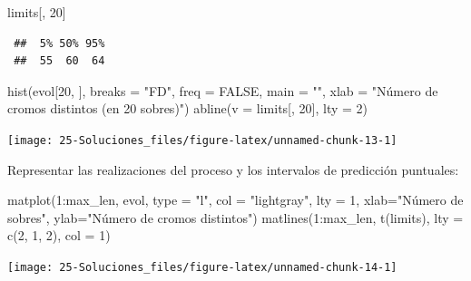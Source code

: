 \documentclass[
]{book}
\newenvironment{Shaded}{\begin{snugshade}}{\end{snugshade}}
\newcommand{\AttributeTok}[1]{\textcolor[rgb]{0.77,0.63,0.00}{#1}}
\newcommand{\ConstantTok}[1]{\textcolor[rgb]{0.00,0.00,0.00}{#1}}
\newcommand{\DecValTok}[1]{\textcolor[rgb]{0.00,0.00,0.81}{#1}}
\newcommand{\FunctionTok}[1]{\textcolor[rgb]{0.00,0.00,0.00}{#1}}
\newcommand{\NormalTok}[1]{#1}
\newcommand{\SpecialCharTok}[1]{\textcolor[rgb]{0.00,0.00,0.00}{#1}}
\newcommand{\StringTok}[1]{\textcolor[rgb]{0.31,0.60,0.02}{#1}}
\theoremstyle{break}
\theoremstyle{nonumberplain}
\begin{document}
\begin{Shaded}
\begin{Highlighting}[]
\NormalTok{limits[, }\DecValTok{20}\NormalTok{]}
\end{Highlighting}
\end{Shaded}

\begin{verbatim}
 ##  5% 50% 95% 
 ##  55  60  64
\end{verbatim}

\begin{Shaded}
\begin{Highlighting}[]
\FunctionTok{hist}\NormalTok{(evol[}\DecValTok{20}\NormalTok{, ], }\AttributeTok{breaks =} \StringTok{"FD"}\NormalTok{, }\AttributeTok{freq =} \ConstantTok{FALSE}\NormalTok{,}
     \AttributeTok{main =} \StringTok{""}\NormalTok{, }\AttributeTok{xlab =} \StringTok{"Número de cromos distintos (en 20 sobres)"}\NormalTok{)}
\FunctionTok{abline}\NormalTok{(}\AttributeTok{v =}\NormalTok{ limits[, }\DecValTok{20}\NormalTok{], }\AttributeTok{lty =} \DecValTok{2}\NormalTok{)}
\end{Highlighting}
\end{Shaded}

\begin{center}\texttt{[image: 25-Soluciones\_files/figure-latex/unnamed-chunk-13-1]} \end{center}

Representar las realizaciones del proceso y los intervalos de predicción puntuales:

\begin{Shaded}
\begin{Highlighting}[]
\FunctionTok{matplot}\NormalTok{(}\DecValTok{1}\SpecialCharTok{:}\NormalTok{max\_len, evol, }\AttributeTok{type =} \StringTok{"l"}\NormalTok{, }\AttributeTok{col =} \StringTok{"lightgray"}\NormalTok{, }\AttributeTok{lty =} \DecValTok{1}\NormalTok{,}
    \AttributeTok{xlab=}\StringTok{"Número de sobres"}\NormalTok{, }\AttributeTok{ylab=}\StringTok{"Número de cromos distintos"}\NormalTok{)}
\FunctionTok{matlines}\NormalTok{(}\DecValTok{1}\SpecialCharTok{:}\NormalTok{max\_len, }\FunctionTok{t}\NormalTok{(limits), }\AttributeTok{lty =} \FunctionTok{c}\NormalTok{(}\DecValTok{2}\NormalTok{, }\DecValTok{1}\NormalTok{, }\DecValTok{2}\NormalTok{), }\AttributeTok{col =} \DecValTok{1}\NormalTok{)}
\end{Highlighting}
\end{Shaded}

\begin{center}\texttt{[image: 25-Soluciones\_files/figure-latex/unnamed-chunk-14-1]} \end{center}
\end{document}
